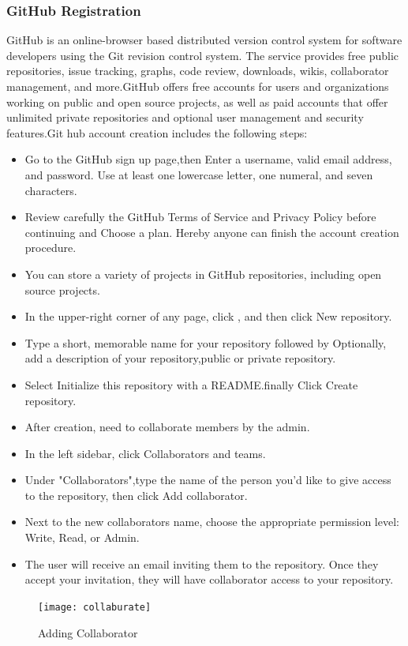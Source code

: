 \documentclass[a4paper, 12pt]{report}
\begin{document}
\subsubsection{GitHub Registration}
GitHub is an online-browser based distributed version control system for software developers using the Git revision control system. The service provides free public repositories, issue tracking, graphs, code review, downloads, wikis, collaborator management, and more.GitHub offers free accounts for users and organizations working on public and open source projects, as well as paid accounts that offer unlimited private repositories and optional user management and security features.Git hub account creation includes the following steps:
 \begin{itemize}
 
 \item Go to the GitHub sign up page,then  Enter a username, valid email address, and password. Use at least one lowercase letter, one numeral, and seven characters.
 \item Review carefully the GitHub Terms of Service and Privacy Policy before continuing and Choose a plan. Hereby anyone can finish the account creation procedure.
 \item  You can store a variety of projects in GitHub repositories, including open source projects. 
 \item In the upper-right corner of any page, click , and then click New repository.
 \item Type a short, memorable name for your repository followed by Optionally, add a description of your repository,public or private repository.
 \item Select Initialize this repository with a README.finally Click Create repository.
 \item After creation, need to collaborate members by the admin. 
 \item In the left sidebar, click Collaborators and teams.
 \item Under "Collaborators",type the name of the person you'd like to give access to the repository, then click Add collaborator.
 \item Next to the new collaborators name, choose the appropriate permission level: Write, Read, or Admin. 
 \item The user will receive an email inviting them to the repository. Once they accept your invitation, they will have collaborator access to your repository.
 \end{itemize} 
 \begin{figure}[hbtp]

\texttt{[image: collaburate]}
\caption{Adding Collaborator
}
\end{figure}
\end{document}
